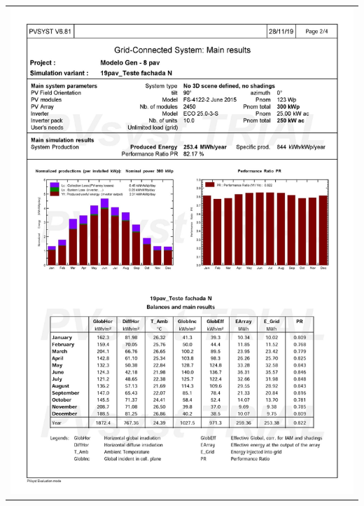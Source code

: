 \begin{table}[H]
    \centering
    \begin{tabular}{l}
        \includegraphics[width=\textwidth]{figures/attachments/resultpv26.jpg}
    \end{tabular}
\end{table}
\pagebreak
